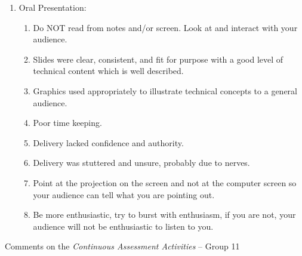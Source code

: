 \documentclass[14pt,twoside]{report}
\begin{document}
\begin{enumerate}
\item Oral Presentation:
\begin{enumerate}
%
\item Do NOT read from notes and/or screen. Look at and interact with your audience.
%
\item Slides were clear, consistent, and fit for purpose with a good level of technical content which is well described.
%
\item Graphics used appropriately to illustrate technical concepts to a general audience. 
%
\item Poor time keeping.
%
\item Delivery lacked confidence and authority.
%
\item Delivery was stuttered and unsure, probably due to nerves. 
%
\item Point at the projection on the screen and not at the computer screen so your audience can tell what you are pointing out.
%
\item Be more enthusiastic, try to burst with enthusiasm, if you are not, your audience will not be enthusiastic to listen to you.
%
\end{enumerate}

\end{enumerate}


\clearpage



\bigskip

\begin{center}
  {\Large Comments on the {\it Continuous Assessment Activities} -- Group 11}
\end{center}
\end{document}
